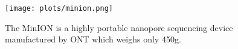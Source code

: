 \begin{figure}
\centering
\texttt{[image: plots/minion.png]}
\caption[The MinION is a highly portable nanopore sequencing
device.]{\label{fig:minion}The MinION is a highly portable nanopore sequencing
device manufactured by ONT which weighs only 450g.}
\end{figure}
